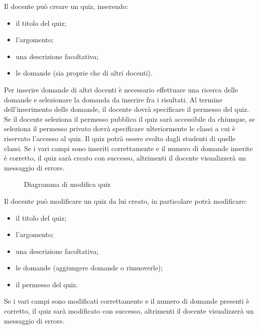 \documentclass[a4paper, titlepage]{article}
\begin{document}
Il docente può creare un quiz, inserendo:
\begin{itemize}
	\item il titolo del quiz; 
	\item l’argomento;
	\item una descrizione facoltativa;
	\item le domande (sia proprie che di altri docenti). 
\end{itemize}
Per inserire domande di altri docenti è necessario effettuare una ricerca delle domande e selezionare la domanda da inserire fra i risultati. Al termine dell’inserimento delle domande, il docente dovrà specificare il permesso del quiz. Se il docente seleziona il permesso pubblico il quiz sarà accessibile da chiunque, se seleziona il permesso privato dovrà specificare ulteriormente le classi a cui è riservato l’accesso al quiz. Il quiz potrà essere svolto dagli studenti di quelle classi. Se i vari campi sono inseriti correttamente e il numero di domande inserite è corretto, il quiz sarà creato con successo, altrimenti il docente visualizzerà un messaggio di errore.

\newpage
{}
\begin{figure}[H]
	\centering
	\noindent{}
	\caption{Diagramma di modifica quiz}
\end{figure}
Il docente può modificare un quiz da lui creato, in particolare potrà modificare:
\begin{itemize}
	\item il titolo del quiz;
	\item l’argomento;
	\item una descrizione facoltativa;
	\item le domande (aggiungere domande o rimuoverle);
	\item il permesso del quiz.
\end{itemize}
Se i vari campi sono modificati correttamente e il numero di domande presenti è corretto, il quiz sarà modificato con successo, altrimenti il docente visualizzerà un messaggio di errore.
\end{document}
